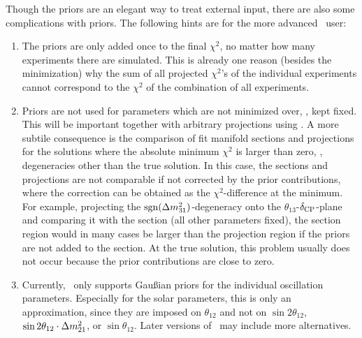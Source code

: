 Though the priors are an elegant way to treat external input, 
there are also some complications with priors. The following hints are for the
more advanced \GLOBES\ user:
\begin{enumerate}
\item
 The priors are only added once to the final $\chi^2$, no matter how
 many experiments there are simulated. This is already one reason
 (besides the minimization) why the sum of all projected $\chi^2$'s of 
 the individual experiments 
 cannot correspond to the $\chi^2$ of the combination of all experiments.
\item
 Priors are not used for parameters which are not minimized over, \ie, 
 kept fixed. This will be important together with arbitrary projections
 using . A more subtile consequence is the comparison
 of fit manifold sections and projections for the solutions where
 the absolute minimum $\chi^2$ is larger than zero, \ie, degeneracies
 other than the true solution. In this case, the sections and
 projections are not  comparable if not corrected by the prior contributions, where the
 correction can be obtained as the $\chi^2$-difference at the minimum.
 For example, projecting the $\mathrm{sgn}(\Delta m_{31}^2)$-degeneracy onto
 the $\theta_{13}$-$\delta_{\mathrm{CP}}$-plane and comparing it with the section
 (all other parameters fixed), the section region would in many cases be 
 larger than the projection region if the priors are not added to the
 section. At the true solution, this problem usually does not occur
 because the prior contributions are close to zero.    
\item
Currently, \GLOBES\ only supports Gau\ss ian priors for the individual
oscillation parameters. Especially for the solar parameters, this is only
 an approximation, since they are imposed on $\theta_{12}$ and not
 on $\sin 2 \theta_{12}$, $\sin 2 \theta_{12} \cdot \Delta m_{21}^2$, or $\sin  
 \theta_{12}$. Later versions of  \GLOBES\ may include more alternatives.
 \end{enumerate}

 
 
